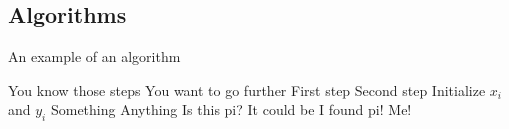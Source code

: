 \subsection{Algorithms}

\begin{algorithm}

    \caption{An example of an algorithm}
    \label{alg:algorithm-example}
    
    \begin{algorithmic}
        \Require You know those steps
        \Require You want to go further
        \State First step
        \State Second step
        \State Initialize $x_i$ and $y_i$
            \State Something
            \State Anything
                \State Is this pi?
                \State It could be
            \EndIf
                \State I found pi!
            \EndFor
        \EndWhile
            \State Me!
    \end{algorithmic}
\end{algorithm}